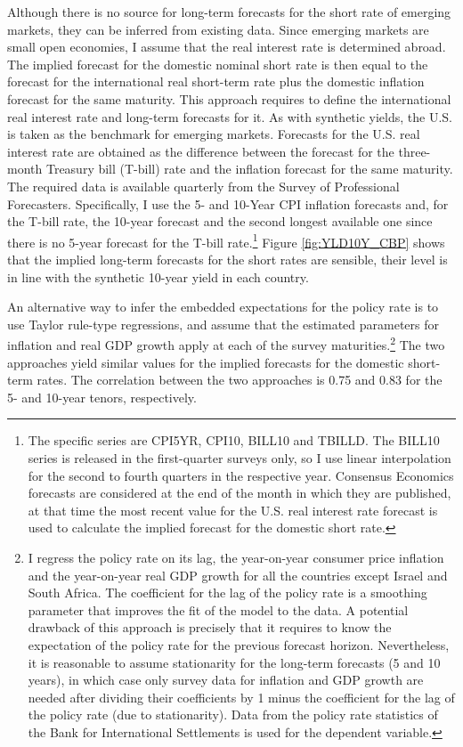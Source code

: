 {Although there is no source for long-term forecasts for the short rate of emerging markets, they can be inferred from existing data. 
Since emerging markets are small open economies, I assume that the real interest rate is determined abroad. 
The implied forecast for the domestic nominal short rate is then equal to the forecast for the international real short-term rate plus the domestic inflation forecast for the same maturity. 
This approach requires to define the international real interest rate and long-term forecasts for it.
As with synthetic yields, the U.S. is taken as the benchmark for emerging markets. 
Forecasts for the U.S. real interest rate are obtained as the difference between the forecast for the three-month Treasury bill (T-bill) rate and the inflation forecast for the same maturity.
The required data is available quarterly from the Survey of Professional Forecasters.
Specifically, I use the 5- and 10-Year CPI inflation forecasts and, for the T-bill rate, the 10-year forecast and the second longest available one
since there is no 5-year forecast for the T-bill rate.\footnote{ The specific series are CPI5YR, CPI10, BILL10 and TBILLD. The BILL10 series is released in the first-quarter surveys only, so I use linear interpolation for the second to fourth quarters in the respective year. Consensus Economics forecasts are considered at the end of the month in which they are published, at that time the most recent value for the U.S. real interest rate forecast is used to calculate the implied forecast for the domestic short rate.}
Figure \ref{fig:YLD10Y_CBP} shows that the implied long-term forecasts for the short rates are sensible, their level is in line with the synthetic 10-year yield in each country.

An alternative way to infer the embedded expectations for the policy rate is to use Taylor rule-type regressions, and assume that the estimated parameters for inflation and real GDP growth apply at each of the survey maturities.\footnote{ I regress the policy rate on its lag, the year-on-year consumer price inflation and the year-on-year real GDP growth for all the countries except Israel and South Africa. The coefficient for the lag of the policy rate is a smoothing parameter that improves the fit of the model to the data. A potential drawback of this approach is precisely that it requires to know the expectation of the policy rate for the previous forecast horizon. Nevertheless, it is reasonable to assume stationarity for the long-term forecasts (5 and 10 years), in which case only survey data for inflation and GDP growth are needed after dividing their coefficients by 1 minus the coefficient for the lag of the policy rate (due to stationarity). Data from the policy rate statistics of the Bank for International Settlements is used for the dependent variable.}
The two approaches yield similar values for the implied forecasts for the domestic short-term rates. 
The correlation  between the two approaches is 0.75 and 0.83 for the 5- and 10-year tenors, respectively.

}
